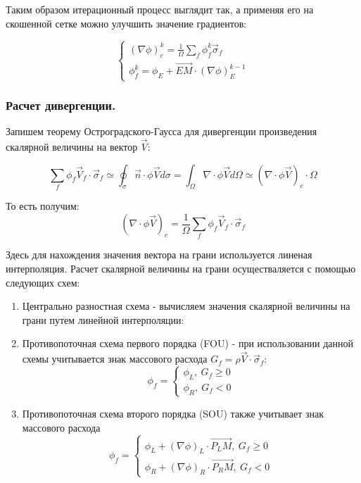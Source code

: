 Таким образом итерационный процесс выглядит так, а применяя его на скошенной сетке можно улучшить значение градиентов:

\begin{equation}
    \begin{cases}
        (\nabla\phi)^k_c=\frac{1}{\Omega}\sum_f\phi^k_f\vec{\sigma}_f\\
        \phi^k_f = \phi_E+\vec{EM}\cdot(\nabla\phi)^{k-1}_E
    \end{cases}
\end{equation}


\subsubsection{Расчет дивергенции.}
Запишем теорему Остроградского-Гаусса для дивергенции произведения скалярной величины на вектор $\vec{V}$:

\begin{equation}
    \sum_f\phi_f\vec{V}_f\cdot\vec{\sigma}_f \simeq \oint_\sigma\vec{n}\cdot\phi\vec{V}d\sigma = \int_\Omega\nabla\cdot\phi\vec{V}d\Omega\simeq(\nabla\cdot\phi\vec{V})_c\cdot\Omega
\end{equation}

То есть получим:
 \begin{equation}
    (\nabla\cdot\phi\vec{V})_c = \frac{1}{\Omega}\sum_f\phi_f\vec{V}_f\cdot\vec{\sigma}_f
 \end{equation}

 Здесь для нахождения значения вектора на грани используется линеная интерполяция. Расчет скалярной величины на грани осуществаляется с помощью следующих схем:

 \begin{enumerate}
    \item Центрально разностная схема - вычисляем значения скалярной величины на грани путем линейной интерполяции:
    \item Противопоточная схема первого порядка (FOU) - при использовании данной схемы учитывается знак массового расхода $G_f = \rho\vec{V}\cdot\vec{\sigma}_f$:
    \begin{equation}
        \phi_f =
        \begin{cases}
            \phi_L,~G_f\geq 0\\
            \phi_R,~G_f<0
        \end{cases}
    \end{equation}
    \item Противопоточная схема второго порядка (SOU) также учитывает знак массового расхода
    \begin{equation}
        \phi_f =
        \begin{cases}
            \phi_L+(\nabla\phi)_L\cdot\vec{P_LM},~G_f\geq 0\\
            \phi_R+(\nabla\phi)_R\cdot\vec{P_RM},~G_f<0
        \end{cases}
    \end{equation}
 \end{enumerate}

